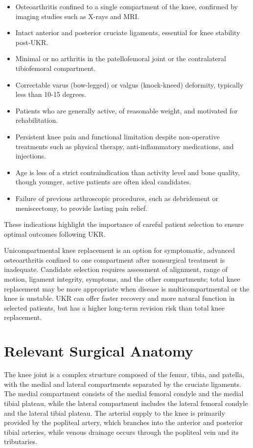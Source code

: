 \begin{itemize}
  \item Osteoarthritis confined to a single compartment of the knee, confirmed by imaging studies such as X-rays and MRI.
  \item Intact anterior and posterior cruciate ligaments, essential for knee stability post-UKR.
  \item Minimal or no arthritis in the patellofemoral joint or the contralateral tibiofemoral compartment.
  \item Correctable varus (bow-legged) or valgus (knock-kneed) deformity, typically less than 10-15 degrees.
  \item Patients who are generally active, of reasonable weight, and motivated for rehabilitation.
  \item Persistent knee pain and functional limitation despite non-operative treatments such as physical therapy, anti-inflammatory medications, and injections.
  \item Age is less of a strict contraindication than activity level and bone quality, though younger, active patients are often ideal candidates.
  \item Failure of previous arthroscopic procedures, such as debridement or meniscectomy, to provide lasting pain relief.
\end{itemize}

These indications highlight the importance of careful patient selection to ensure optimal outcomes following UKR.

Unicompartmental knee replacement is an option for symptomatic, advanced osteoarthritis confined to one compartment after nonsurgical treatment is inadequate. Candidate selection requires assessment of alignment, range of motion, ligament integrity, symptoms, and the other compartments; total knee replacement may be more appropriate when disease is multicompartmental or the knee is unstable. UKR can offer faster recovery and more natural function in selected patients, but has a higher long-term revision risk than total knee replacement.

\section*{Relevant Surgical Anatomy}
The knee joint is a complex structure composed of the femur, tibia, and patella, with the medial and lateral compartments separated by the cruciate ligaments. The medial compartment consists of the medial femoral condyle and the medial tibial plateau, while the lateral compartment includes the lateral femoral condyle and the lateral tibial plateau. The arterial supply to the knee is primarily provided by the popliteal artery, which branches into the anterior and posterior tibial arteries, while venous drainage occurs through the popliteal vein and its tributaries. 

